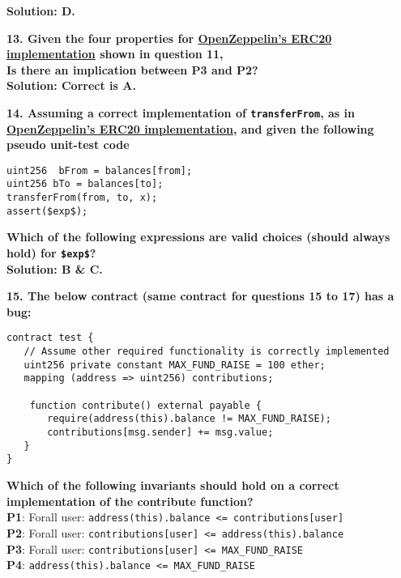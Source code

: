 \textbf{Solution: D.}

\textbf{13. Given the four properties for \href{https://github.com/OpenZeppelin/openzeppelin-contracts/blob/master/contracts/token/ERC20/ERC20.sol}{OpenZeppelin's ERC20 implementation} shown in question 11,\\ Is there an implication between P3 and P2?}\label{sec:raceXcertora_q13}\\

\textbf{Solution: Correct is A.}

\textbf{14. Assuming a correct implementation of \texttt{transferFrom}, as in \href{https://github.com/OpenZeppelin/openzeppelin-contracts/blob/master/contracts/token/ERC20/ERC20.sol}{OpenZeppelin's ERC20 implementation}, and given the following pseudo unit-test code}

\begin{lstlisting}[language=Solidity, style=Solstyle]
uint256  bFrom = balances[from];
uint256 bTo = balances[to];
transferFrom(from, to, x);
assert($exp$);
\end{lstlisting}

\textbf{Which of the following expressions are valid choices (should always hold) for \texttt{\$exp\$}?}\label{sec:raceXcertora_q14}\\

\textbf{Solution: B \& C.}

\textbf{15. The below contract (same contract for questions 15 to 17) has a bug:}

\begin{lstlisting}[language=Solidity, style=solStyle]
contract test {
   // Assume other required functionality is correctly implemented
   uint256 private constant MAX_FUND_RAISE = 100 ether;
   mapping (address => uint256) contributions;

    function contribute() external payable {
       require(address(this).balance != MAX_FUND_RAISE);
       contributions[msg.sender] += msg.value;
   }
}
\end{lstlisting}

\textbf{Which of the following invariants should hold on a correct implementation of the contribute function?}\\

\textbf{P1}: Forall user: \verb|address(this).balance <= contributions[user]|\\
\textbf{P2}: Forall user: \verb|contributions[user] <= address(this).balance|\\
\textbf{P3}: Forall user: \verb|contributions[user] <= MAX_FUND_RAISE|\\
\textbf{P4}: \verb|address(this).balance <= MAX_FUND_RAISE|\label{sec:raceXcertora_q15}\\

